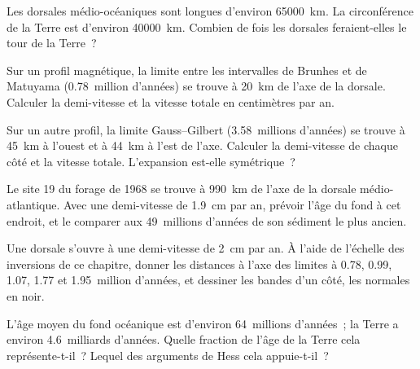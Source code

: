 \begin{exercise}[$\star$]\label{exo:g11:drift-to-spreading:5}
Les dorsales médio-océaniques sont longues d'environ \qty{65000}{km}. La
circonférence de la Terre est d'environ \qty{40000}{km}. Combien de fois
les dorsales feraient-elles le tour de la Terre~?
\end{exercise}

\begin{exercise}[$\star\star$]\label{exo:g11:drift-to-spreading:6}
Sur un profil magnétique, la limite entre les intervalles de Brunhes et de
Matuyama (\num{0.78}~million d'années) se trouve à \qty{20}{km} de l'axe de
la dorsale. Calculer la demi-vitesse et la vitesse totale en centimètres
par an.
\end{exercise}

\begin{exercise}[$\star\star$]\label{exo:g11:drift-to-spreading:7}
Sur un autre profil, la limite Gauss--Gilbert (\num{3.58}~millions
d'années) se trouve à \qty{45}{km} à l'ouest et à \qty{44}{km} à l'est de
l'axe. Calculer la demi-vitesse de chaque côté et la vitesse totale.
L'expansion est-elle symétrique~?
\end{exercise}

\begin{exercise}[$\star\star$]\label{exo:g11:drift-to-spreading:8}
Le site 19 du forage de 1968 se trouve à \qty{990}{km} de l'axe de la
dorsale médio-atlantique. Avec une demi-vitesse de \qty{1.9}{cm} par an,
prévoir l'âge du fond à cet endroit, et le comparer aux \num{49}~millions
d'années de son sédiment le plus ancien.
\end{exercise}

\begin{exercise}[$\star\star$]\label{exo:g11:drift-to-spreading:9}
Une dorsale s'ouvre à une demi-vitesse de \qty{2}{cm} par an. À l'aide de
l'échelle des inversions de ce chapitre, donner les distances à l'axe des
limites à 0.78, 0.99, 1.07, 1.77 et 1.95~million d'années, et dessiner les
bandes d'un côté, les normales en noir.
\end{exercise}

\begin{exercise}[$\star\star$]\label{exo:g11:drift-to-spreading:10}
L'âge moyen du fond océanique est d'environ \num{64}~millions d'années~; la
Terre a environ \num{4.6}~milliards d'années. Quelle fraction de l'âge de
la Terre cela représente-t-il~? Lequel des arguments de Hess cela
appuie-t-il~?
\end{exercise}

